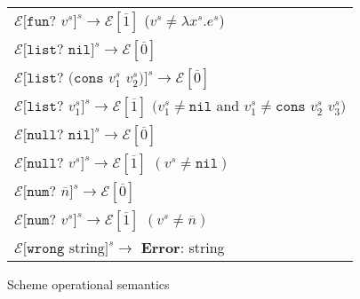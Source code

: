 \begin{figure}[p]
\begin{tabular}{l}
$\mathscr{E}[\mathtt{fun?}$ $v^s]^s\rightarrow\mathscr{E}[\overline{1}]$ ($v^s\neq\lambda x^s.e^s$) \\

$\mathscr{E}[\mathtt{list?}$ $\mathtt{nil}]^s\rightarrow\mathscr{E}[\overline{0}]$ \\

$\mathscr{E}[\mathtt{list?}$ $(\mathtt{cons}$ $v^s_1$ $v^s_2)]^s\rightarrow\mathscr{E}[\overline{0}]$ \\

$\mathscr{E}[\mathtt{list?}$ $v^s_1]^s\rightarrow\mathscr{E}[\overline{1}]$ $(v^s_1\neq\mathtt{nil}$ and $v^s_1\neq\mathtt{cons}$ $v^s_2$ $v^s_3)$ \\

$\mathscr{E}[\mathtt{null?}$ $\mathtt{nil}]^s\rightarrow\mathscr{E}[\overline{0}]$ \\

$\mathscr{E}[\mathtt{null?}$ $v^s]^s\rightarrow\mathscr{E}[\overline{1}]$ $(v^s\neq\mathtt{nil})$ \\

$\mathscr{E}[\mathtt{num?}$ $\overline{n}]^s\rightarrow\mathscr{E}[\overline{0}]$ \\

$\mathscr{E}[\mathtt{num?}$ $v^s]^s\rightarrow\mathscr{E}[\overline{1}]$ $(v^s\neq\overline{n})$ \\

$\mathscr{E}[\mathtt{wrong}$ $\mathrm{string}]^s\rightarrow$ \textbf{Error}: string

\end{tabular}
\caption{Scheme operational semantics}
\label{sos}
\end{figure}